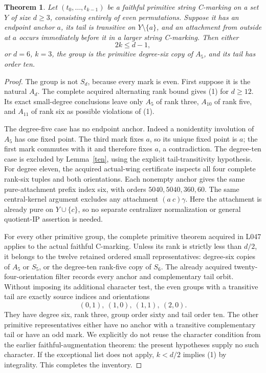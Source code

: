 \documentclass[11pt,a4paper]{article}
\newtheorem{theorem}[lemma]{Theorem}
\begin{document}
\begin{theorem}\label{primitive}
Let $(t_0,\ldots,t_{k-1})$ be a faithful primitive string C-marking
on a set $Y$ of size $d\ge3$, consisting entirely of even
permutations. Suppose it has an endpoint anchor $a$, its tail is
transitive on $Y\setminus\{a\}$, and an attachment from outside
at $a$ occurs immediately before it in a larger string C-marking.
Then either
\[
                         2k\le d-1,                 \tag{1}
\]
or $d=6$, $k=3$, the group is the primitive degree-six copy of
$A_5$, and its tail has order ten.
\end{theorem}
\begin{proof}
The group is not $S_d$, because every mark is even. First suppose
it is the natural $A_d$. The complete acquired alternating rank
bound gives (1) for $d\ge12$. Its exact small-degree conclusions
leave only $A_5$ of rank three, $A_{10}$ of rank five, and $A_{11}$
of rank six as possible violations of (1).

The degree-five case has no endpoint anchor. Indeed a nonidentity
involution of $A_5$ has one fixed point. The third mark fixes $a$,
so its unique fixed point is $a$; the first mark commutes with it
and therefore fixes $a$, a contradiction.
The degree-ten case is excluded by Lemma~\ref{ten}, using the
explicit tail-transitivity hypothesis.
For degree eleven, the acquired actual-wing certificate inspects
all four complete rank-six tuples and both orientations. Each
nonempty anchor gives the same pure-attachment prefix index six,
with orders $5040,5040,360,60$. The same central-kernel argument
excludes any attachment $(a\ c)\gamma$. Here the attachment is
already pure on $Y\cup\{c\}$, so no separate centralizer
normalization or general quotient-IP assertion is needed.

For every other primitive group, the complete primitive theorem
acquired in L047 applies to the actual faithful C-marking. Unless
its rank is strictly less than $d/2$, it belongs to the twelve
retained ordered small representatives: degree-six copies of
$A_5$ or $S_5$, or the degree-ten rank-five copy of $S_6$.
The already acquired twenty-four-orientation filter records every
anchor and complementary tail orbit. Without imposing its
additional character test, the even groups with a transitive tail
are exactly source indices and orientations
\[
                  (0,1),\ (1,0),\ (1,1),\ (2,0).
\]
They have degree six, rank three, group order sixty and tail order
ten. The other primitive representatives either have no anchor
with a transitive complementary tail or have an odd mark. We
explicitly do not reuse the character condition from the earlier
faithful-augmentation theorem: the present hypotheses supply no
such character. If the exceptional list does not apply, $k<d/2$
implies (1) by integrality. This completes the inventory.
\end{proof}
\end{document}
